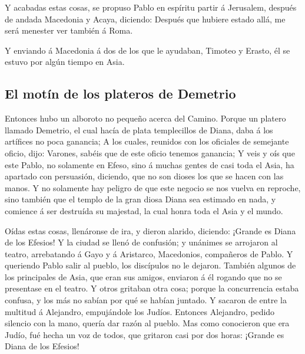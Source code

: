  Y acabadas estas cosas, se propuso Pablo en espíritu
partir á Jerusalem, después de andada Macedonia y Acaya, diciendo:
Después que hubiere estado allá, me será menester ver también á Roma.

 Y enviando á Macedonia á dos de los que le ayudaban,
Timoteo y Erasto, él se estuvo por algún tiempo en Asia.

\hypertarget{el-motuxedn-de-los-plateros-de-demetrio}{%
\subsection{El motín de los plateros de
Demetrio}\label{el-motuxedn-de-los-plateros-de-demetrio}}

 Entonces hubo un alboroto no pequeño acerca del Camino.
 Porque un platero llamado Demetrio, el cual hacía de plata
templecillos de Diana, daba á los artífices no poca ganancia;
 A los cuales, reunidos con los oficiales de semejante
oficio, dijo: Varones, sabéis que de este oficio tenemos ganancia;
 Y veis y oís que este Pablo, no solamente en Efeso, sino á
muchas gentes de casi toda el Asia, ha apartado con persuasión,
diciendo, que no son dioses los que se hacen con las manos.
 Y no solamente hay peligro de que este negocio se nos
vuelva en reproche, sino también que el templo de la gran diosa Diana
sea estimado en nada, y comience á ser destruída su majestad, la cual
honra toda el Asia y el mundo.

 Oídas estas cosas, llenáronse de ira, y dieron alarido,
diciendo: ¡Grande es Diana de los Efesios!  Y la ciudad se
llenó de confusión; y unánimes se arrojaron al teatro, arrebatando á
Gayo y á Aristarco, Macedonios, compañeros de Pablo.  Y
queriendo Pablo salir al pueblo, los discípulos no le dejaron.
 También algunos de los principales de Asia, que eran sus
amigos, enviaron á él rogando que no se presentase en el teatro.
 Y otros gritaban otra cosa; porque la concurrencia estaba
confusa, y los más no sabían por qué se habían juntado.  Y
sacaron de entre la multitud á Alejandro, empujándole los Judíos.
Entonces Alejandro, pedido silencio con la mano, quería dar razón al
pueblo.  Mas como conocieron que era Judío, fué hecha un
voz de todos, que gritaron casi por dos horas: ¡Grande es Diana de los
Efesios!

